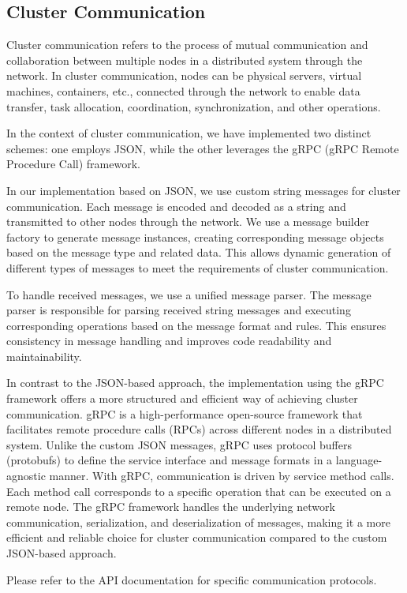 \documentclass[sigconf]{acmart}
\begin{document}
\subsection{Cluster Communication}

Cluster communication refers to the process of mutual communication and collaboration between multiple nodes in a distributed system through the network. In cluster communication, nodes can be physical servers, virtual machines, containers, etc., connected through the network to enable data transfer, task allocation, coordination, synchronization, and other operations.

In the context of cluster communication, we have implemented two distinct schemes: one employs JSON, while the other leverages the gRPC (gRPC Remote Procedure Call) framework.

In our implementation based on JSON, we use custom string messages for cluster communication. Each message is encoded and decoded as a string and transmitted to other nodes through the network. We use a message builder factory to generate message instances, creating corresponding message objects based on the message type and related data. This allows dynamic generation of different types of messages to meet the requirements of cluster communication.

To handle received messages, we use a unified message parser. The message parser is responsible for parsing received string messages and executing corresponding operations based on the message format and rules. This ensures consistency in message handling and improves code readability and maintainability.

In contrast to the JSON-based approach, the implementation using the gRPC framework offers a more structured and efficient way of achieving cluster communication. gRPC is a high-performance open-source framework that facilitates remote procedure calls (RPCs) across different nodes in a distributed system. Unlike the custom JSON messages, gRPC uses protocol buffers (protobufs) to define the service interface and message formats in a language-agnostic manner. With gRPC, communication is driven by service method calls. Each method call corresponds to a specific operation that can be executed on a remote node. The gRPC framework handles the underlying network communication, serialization, and deserialization of messages, making it a more efficient and reliable choice for cluster communication compared to the custom JSON-based approach.

Please refer to the API documentation for specific communication protocols.
\end{document}

